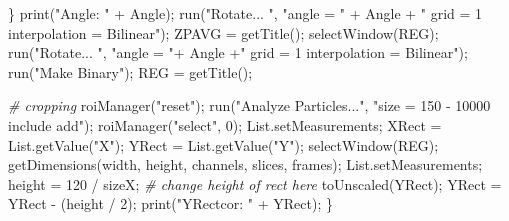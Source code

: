 \documentclass[10pt, b5paper, singlespacinge, twoside]{reedthesis} %
\newenvironment{Shaded}{}{}
\newcommand{\CommentTok}[1]{\textit{#1}}
\newcommand{\DecValTok}[1]{#1}
\newcommand{\FunctionTok}[1]{#1}
\newcommand{\NormalTok}[1]{#1}
\newcommand{\OtherTok}[1]{#1}
\newcommand{\SpecialCharTok}[1]{#1}
\newcommand{\StringTok}[1]{#1}
\theoremstyle{definition}
\theoremstyle{definition}
\theoremstyle{definition}
\theoremstyle{remark}
\begin{document}
\begin{Shaded}
\begin{Highlighting}[numbers=left,,]
\NormalTok{            \}}
            \FunctionTok{print}\NormalTok{(}\StringTok{"Angle: "} \SpecialCharTok{+}\NormalTok{ Angle);}
            \FunctionTok{run}\NormalTok{(}\StringTok{"Rotate... "}\NormalTok{, }
                \StringTok{"angle = "} \SpecialCharTok{+}\NormalTok{ Angle }\SpecialCharTok{+} \StringTok{" grid = 1 interpolation = Bilinear"}\NormalTok{);}
\NormalTok{            ZPAVG }\OtherTok{=} \FunctionTok{getTitle}\NormalTok{();}
            \FunctionTok{selectWindow}\NormalTok{(REG);}
            \FunctionTok{run}\NormalTok{(}\StringTok{"Rotate... "}\NormalTok{, }
                \StringTok{"angle = "}\SpecialCharTok{+}\NormalTok{ Angle }\SpecialCharTok{+}\StringTok{" grid = 1 interpolation = Bilinear"}\NormalTok{);}
            \FunctionTok{run}\NormalTok{(}\StringTok{"Make Binary"}\NormalTok{);}
\NormalTok{            REG }\OtherTok{=} \FunctionTok{getTitle}\NormalTok{();}
        
        \CommentTok{\# cropping}
            \FunctionTok{roiManager}\NormalTok{(}\StringTok{"reset"}\NormalTok{);}
            \FunctionTok{run}\NormalTok{(}\StringTok{"Analyze Particles..."}\NormalTok{, }
                \StringTok{"size = 150 {-} 10000 include add"}\NormalTok{);}
            \FunctionTok{roiManager}\NormalTok{(}\StringTok{"select"}\NormalTok{, }\DecValTok{0}\NormalTok{);}
\NormalTok{            List.setMeasurements;}
\NormalTok{            XRect }\OtherTok{=} \FunctionTok{List.getValue}\NormalTok{(}\StringTok{"X"}\NormalTok{);}
\NormalTok{            YRect }\OtherTok{=} \FunctionTok{List.getValue}\NormalTok{(}\StringTok{"Y"}\NormalTok{);}
            \FunctionTok{selectWindow}\NormalTok{(REG);}
            \FunctionTok{getDimensions}\NormalTok{(width, height, channels, slices, frames);}
\NormalTok{            List.setMeasurements;}
\NormalTok{            height }\OtherTok{=} \DecValTok{120} \SpecialCharTok{/}\NormalTok{ sizeX; }\CommentTok{\# change height of rect here}
            \FunctionTok{toUnscaled}\NormalTok{(YRect);}
\NormalTok{            YRect }\OtherTok{=}\NormalTok{ YRect }\SpecialCharTok{{-}}\NormalTok{ (height }\SpecialCharTok{/} \DecValTok{2}\NormalTok{);}
            \FunctionTok{print}\NormalTok{(}\StringTok{"YRectcor: "} \SpecialCharTok{+}\NormalTok{ YRect);}
\NormalTok{        \} }


\end{Highlighting}
\end{Shaded}
\end{document}
